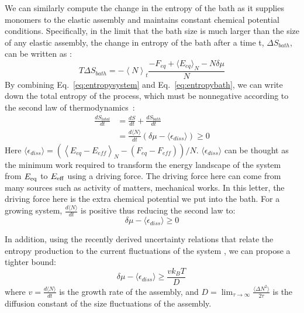 \documentclass[amsmath,preprintnumbers,10pt,nofootinbib,prl,twocolumn]{revtex4-1}
\begin{document}
We can similarly compute the change in the entropy of the bath as it supplies monomers to the elastic assembly and maintains constant chemical potential conditions. Specifically, in the limit that the bath size is much larger than the size of any elastic assembly, the change in entropy of the bath after a time t, $\Delta S_{bath}$, can be written as :
\begin{equation}
\label{eq:entropybath}
 T\Delta S_{bath}=-\left\langle N \right\rangle_t \frac{-F_{\mathit{eq}} + \langle E_{\mathit{eq}} \rangle _N-N\delta\mu}{N}
\end{equation}
By combining Eq.~\ref{eq:entropysystem} and Eq.~\ref{eq:entropybath}, we can write down the total entropy of the process, which must be nonnegative according to the second law of thermodynamics~\cite{Esposito2012}:
\begin{equation}
\begin{split}
\label{eq:entropytotal}
\frac{dS_{total}}{dt}&=\frac{dS}{dt} +\frac{dS_\mathit{bath}}{dt}\\
&= \frac{d\langle N\rangle}{dt}\left ( \delta\mu-\langle\epsilon_{diss}\rangle \right) \geq 0
\end{split}
\end{equation}
Here $\langle\epsilon_{diss}\rangle=\left (\left\langle E_{eq}-E_{\mathit{eff}}\right\rangle _N-\left ( F_{eq}-F_{\mathit{eff}}\right )\right )/N$. $\langle\epsilon_{diss}\rangle$ can be thought as the minimum work required to transform the energy landscape of the system from $E_{\rm eq}$ to $E_{\rm eff}$ using a driving force. The driving force here can come from many sources such as activity of matters, mechanical works. In this letter, the driving force here is the extra chemical potential we put into the bath.  For a growing system, $\frac{d\langle N \rangle}{dt}$ is positive thus reducing the second law to:
\begin{equation}
\label{eq:firstbound}
\delta\mu-\langle\epsilon_{diss}\rangle\geq0
\end{equation}

In addition, using the recently derived uncertainty relations that relate the entropy production to the current fluctuations of the system \cite{Barato2015, Gingrich2016,Nguyen2016}, we can propose a tighter bound:
\begin{equation}
\label{eq:secondbound}
\delta\mu-\langle\epsilon_{diss}\rangle\geq\frac{v k_B T}{D}\, 
\end{equation}
where $v=\frac{d\langle N\rangle}{dt}$ is the growth rate of the assembly, and $D=\lim_{\tau\to\infty}\frac{\langle\Delta N^2\rangle}{2\tau}$  is the diffusion constant of the size fluctuations of the assembly.
\end{document}
